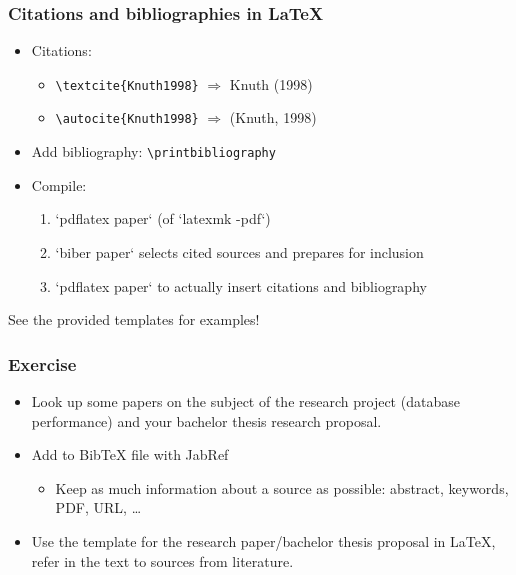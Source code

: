 \documentclass{beamer}
\begin{document}
\begin{frame}[fragile]
  \frametitle{Citations and bibliographies in {\LaTeX}}
  
  \begin{itemize}
  \item Citations:
  
  \begin{itemize}
    \item \verb|\textcite{Knuth1998}| $\Rightarrow$ Knuth (1998)
    \item \verb|\autocite{Knuth1998}| $\Rightarrow$ (Knuth, 1998)
  \end{itemize}
  
  \item Add bibliography: \verb|\printbibliography|
  
  \item Compile:
  
  \begin{enumerate}
    \item `pdflatex paper` (of `latexmk -pdf`)
    \item `biber paper` selects cited sources and prepares for inclusion
    \item `pdflatex paper` to actually insert citations and bibliography
  \end{enumerate}
  \end{itemize}
  
  See the provided templates for examples!
\end{frame}

\begin{frame}
  \frametitle{Exercise}

  \begin{itemize}
    \item Look up some papers on the subject of the research project (database performance) and your bachelor thesis research proposal.
    \item Add to Bib{\TeX} file with JabRef
      \begin{itemize}
        \item Keep as much information about a source as possible: abstract, keywords, PDF, URL, \dots
      \end{itemize}
    \item Use the template for the research paper/bachelor thesis proposal in {\LaTeX}, refer in the text to sources from literature.
  \end{itemize}
\end{frame}
\end{document}
